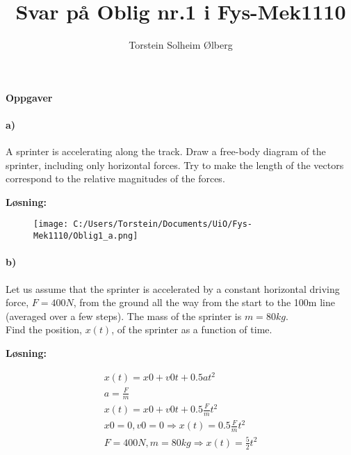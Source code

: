 \documentclass[11pt, A4paper,norsk]{article}
\author{Torstein Solheim Ølberg}
\title{Svar på Oblig nr.1 i Fys-Mek1110}
\begin{document}
\maketitle
	\begin{center}
\Large \textbf{Oppgaver}
	\end{center}
		\paragraph{a)}
			\begin{flushleft}
A sprinter is accelerating along the track. Draw a free-body diagram of the sprinter, including only horizontal forces. Try to make the length of the vectors correspond to the relative magnitudes of the forces.
			\end{flushleft}
			\begin{flushleft}
\textbf{Løsning:}
			\end{flushleft}
			\begin{figure}
\texttt{[image: C:/Users/Torstein/Documents/UiO/Fys-Mek1110/Oblig1\_a.png]}
			\end{figure}
		\paragraph{b)}
			\begin{flushleft}
Let us assume that the sprinter is accelerated by a constant horizontal driving force, $F = 400N$, from the ground all the way from the start to the 100m line (averaged over a few steps). The mass of the sprinter is $m = 80kg$. \\
\vspace{2mm} Find the position, $x(t)$, of the sprinter as a function of time.
			\end{flushleft}
			\begin{flushleft}
\textbf{Løsning:}
			\end{flushleft}
			\begin{flushleft}
				\begin{align}
x(t) = x0 + v0t + 0.5at^{2} \\
a = \frac{F}{m} \\
x(t) = x0 + v0t + 0.5\frac{F}{m}t^{2} \\
x0 = 0, v0 = 0 \Rightarrow x(t) = 0.5\frac{F}{m}t^{2} \\
F = 400N, m = 80kg \Rightarrow x(t) = \frac{5}{2}t^{2}
				\end{align}

			\end{flushleft}
\end{document}
